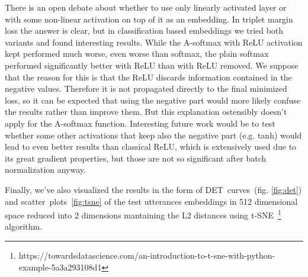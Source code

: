 \medskip
There is an open debate about whether to use only linearly activated layer or with some non-linear activation on top of it as an embedding. In triplet margin loss the answer is clear, but in classification based embeddings we tried both variants and found interesting results. While the A-softmax with ReLU activation kept performed much worse, even worse than softmax, the plain softmax performed significantly better with ReLU than with ReLU removed. We suppose that the reason for this is that the ReLU discards information contained in the negative values. Therefore it is not propagated directly to the final minimized loss, so it can be expected that using the negative part would more likely confuse the results rather than improve them. But this explanation ostensibly doesn't apply for the A-softmax function. Interesting future work would be to test whether some other activations that keep also the negative part (e.g. tanh) would lead to even better results than classical ReLU, which is extensively used due to its great gradient properties, but those are not so significant after batch normalization anyway.

\medskip
Finally, we've also visualized the results in the form of DET~curves~(fig. \ref{fig:det}) and scatter~plots~\ref{fig:tsne} of the test utterances embeddings in 512 dimensional space reduced into 2 dimensions mantaining the L2 distances using t-SNE~\footnote{https://towardsdatascience.com/an-introduction-to-t-sne-with-python-example-5a3a293108d1} algorithm.

